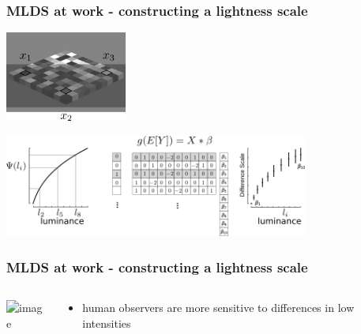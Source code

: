 \documentclass[]{beamer}
\begin{document}
\begin{frame}
\frametitle{MLDS at work - constructing a lightness scale}
\begin{center}
 \includegraphics[width=40mm]{figs/l6/adelson_triad.png}
\vspace{3mm}

 \includegraphics[width=100mm]{figs/l6/mlds_model.png}
\end{center}
\end{frame}

\begin{frame}
\frametitle{MLDS at work - constructing a lightness scale}
\begin{overlayarea}{110mm}{60mm}
\begin{columns}[T]
\begin{column}{50mm}
\begin{center}
 \includegraphics<1->[width=50mm]{figs/l6/mlds_scale_contrast.png}
\end{center}
 \end{column}

\begin{column}{50mm}
\begin{itemize}
 \item human observers are more sensitive to differences in low intensities
\end{itemize}

\end{column}
\end{columns}
\end{overlayarea}
\end{frame}
\end{document}
